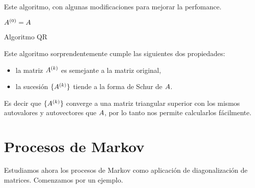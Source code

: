 Este algoritmo, con algunas modificaciones para mejorar la perfomance.

\begin{algorithm}[H]
\SetAlgoLined
 $\Ab^{(0)} = \Ab$\;
 \caption{Algoritmo QR}
\end{algorithm}

Este algoritmo sorprendentemente cumple las siguientes dos propiedades:
\begin{itemize}
\item la matriz $\Ab^{(k)}$ es semejante a la matriz original,
\item la sucesión $\{\Ab^{(k)}\}$ tiende a la forma de Schur de $\Ab$.
\end{itemize}

Es decir que $\{\Ab^{(k)}\}$ converge a una matriz triangular superior con los mismos autovalores y autovectores que $\Ab$, por lo tanto nos permite calcularlos fácilmente.







\section{Procesos de Markov}

Estudiamos ahora los procesos de Markov como aplicación de diagonalización de matrices. Comenzamos por un ejemplo.



